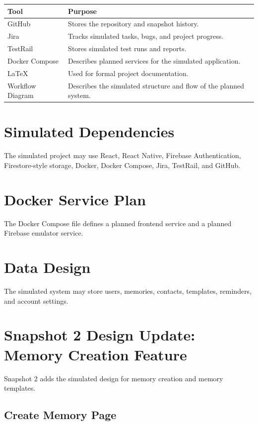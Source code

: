 \documentclass{article}
\begin{document}
\begin{longtable}{|p{4cm}|p{9cm}|}
\hline
Tool & Purpose \\ \hline
GitHub & Stores the repository and snapshot history. \\ \hline
Jira & Tracks simulated tasks, bugs, and project progress. \\ \hline
TestRail & Stores simulated test runs and reports. \\ \hline
Docker Compose & Describes planned services for the simulated application. \\ \hline
LaTeX & Used for formal project documentation. \\ \hline
Workflow Diagram & Describes the simulated structure and flow of the planned system. \\ \hline
\end{longtable}

\section{Simulated Dependencies}

The simulated project may use React, React Native, Firebase Authentication, Firestore-style storage, Docker, Docker Compose, Jira, TestRail, and GitHub.

\section{Docker Service Plan}

The Docker Compose file defines a planned frontend service and a planned Firebase emulator service.

\section{Data Design}

The simulated system may store users, memories, contacts, templates, reminders, and account settings.

\section{Snapshot 2 Design Update: Memory Creation Feature}

Snapshot 2 adds the simulated design for memory creation and memory templates.

\subsection{Create Memory Page}
\end{document}
